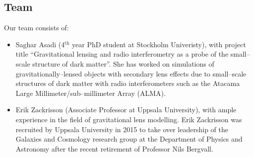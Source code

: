 \documentclass[a4paper, 11pt]{article}
\begin{document}
\subsection{Team}
Our team consists of:
\begin{itemize}
\item Saghar Asadi (4$^\mathrm{th}$ year PhD student at Stockholm Univeristy), with project title ``Gravitational lensing and radio interferometry as a probe of the small--scale structure of dark matter''. She has worked on simulations of gravitationally--lensed objects with secondary lens effects due to small--scale structures of dark matter with radio interferometers such as the Atacama Large Millimeter/sub--millimeter Array (ALMA).
\item Erik Zackrisson (Associate Professor at Uppsala University), with ample experience in the field of gravitational lens modelling. Erik Zackrisson was recruited by Uppsala University in 2015 to take over leadership of the Galaxies and Cosmology research group at the Department of Physics and Astronomy after the recent retirement of Professor Nils Bergvall.
\end{itemize}
\end{document}
